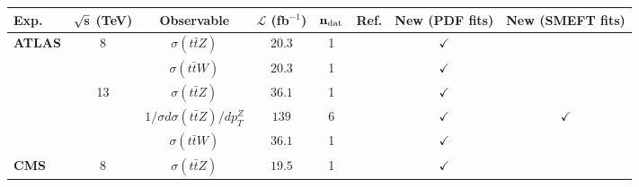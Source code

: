 \begin{table}[t]
  \begin{center}
{\fontsize{8pt}{8pt}\selectfont
  \centering
   \renewcommand{\arraystretch}{2}
   \setlength{\tabcolsep}{5pt}
   \begin{tabular}{lccccc|c|c}
     \toprule \textbf{Exp.}   & $\bf{\sqrt{s}}$ \textbf{(TeV)}    
    &  \textbf{Observable} & $\mathcal{L}$ (fb${}^{-1}$) & $\mathbf{n_{\rm dat}}$ & \textbf{Ref.}
     &\textbf{New (PDF fits)}
    &  \textbf{New (SMEFT fits)}\\
    \toprule
    {\bf ATLAS}
    & 8
    & $\sigma(t\bar{t}Z)$
    & $20.3$
    & 1
    &  \cite{Aad:2015eua}
      & $\checkmark$                                                                     
      &  \\
    & 
    & $\sigma(t\bar{t}W)$
    & $20.3$
    & 1
    & \cite{Aad:2015eua}
      & $\checkmark$                                                                     
      &  \\\midrule
    & 13
    & $\sigma(t\bar{t}Z)$
    & $36.1$
    & 1
    &\cite{Aaboud:2019njj}
       & $\checkmark$                                                                     
      &  \\
    & 
    & $1/\sigma d\sigma(t\bar{t}Z)/dp_T^Z$
    & $139$
    & 6
    &  \cite{ATLAS:2021fzm}
      & $\checkmark$                                                                     
      & $\checkmark$ \\
    & 
    & $\sigma(t\bar{t}W)$
    & $36.1$
    & 1
    &  \cite{Aaboud:2019njj}
      & $\checkmark$                                                                     
      &  \\
  \midrule
     {\bf  CMS}
    & 8
    & $\sigma(t\bar{t}Z)$
    & $19.5$
    & 1
    & \cite{Khachatryan:2015sha}
       & $\checkmark$                                                                     
      &  \\

\end{tabular}}
\end{center}
\end{table}
